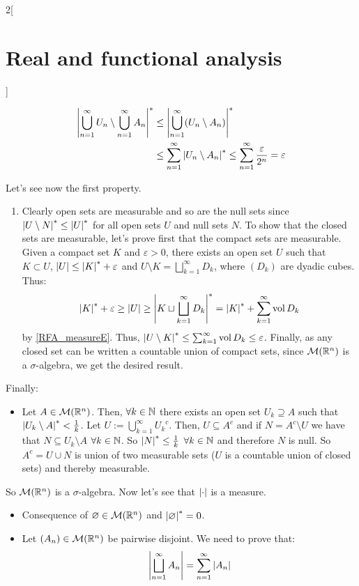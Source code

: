 \documentclass[../../../main_math.tex]{subfiles}
\begin{document}
\begin{multicols}{2}[\section{Real and functional analysis}]
\begin{sproof}
\begin{itemize}
            \begin{align*}
              \om{\bigcup_{n=1}^\infty U_n\setminus\bigcup_{n=1}^\infty A_n} & \leq \om{\bigcup_{n=1}^\infty (U_n\setminus A_n)}                                                      \\
                                                                             & \leq\sum_{n=1}^{\infty}\om{U_n\setminus A_n}\leq\sum_{n=1}^{\infty}\frac{\varepsilon}{2^n}=\varepsilon
            \end{align*}
    \end{itemize}
    Let's see now the first property.
    \begin{enumerate}
      \item Clearly open sets are measurable and so are the null sets since $\om{U\setminus N}\leq\om{U}$ for all open sets $U$ and null sets $N$. To show that the closed sets are measurable, let's prove first that the compact sets are measurable. Given a compact set $K$ and $\varepsilon>0$, there exists an open set $U$ such that $K\subset U$, $\m{U}\leq\om{K}+\varepsilon$ and $U\setminus K=\bigsqcup_{k=1}^\infty D_k$, where $(D_k)$ are dyadic cubes. Thus:
            $$\om{K}+\varepsilon\geq \m{U}\geq\om{K\sqcup\bigsqcup_{k=1}^\infty D_k}=\om{K}+\sum_{k=1}^\infty \vol{D_k}$$
            by \cref{RFA_measureE}. Thus, $\om{U\setminus K}\leq \sum_{k=1}^\infty \vol{D_k}\leq \varepsilon$. Finally, as any closed set can be written a countable union of compact sets, since $\mathcal{M}(\mathbb{R}^n)$ is a $\sigma$-algebra, we get the desired result.
    \end{enumerate}
    Finally:
    \begin{itemize} \item Let $A\in\mathcal{M}(\mathbb{R}^n)$. Then, $\forall k\in\mathbb{N}$ there exists an open set $U_k\supseteq A$ such that $\om{U_k\setminus A}<\frac{1}{k}$. Let $U:=\bigcup_{k=1}^\infty {U_k}^c$. Then, $U\subseteq A^c$ and if $N=A^c\setminus U$ we have that $N\subseteq U_k\setminus A$ $\forall k\in\mathbb{N}$. So $\om{N}\leq\frac{1}{k}$ $\forall k\in\mathbb{N}$ and therefore $N$ is null. So $A^c = U\cup N$ is union of two measurable sets ($U$ is a countable union of closed sets) and thereby measurable.
    \end{itemize}
    So $\mathcal{M}(\mathbb{R}^n)$ is a $\sigma$-algebra. Now let's see that $\m{\cdot}$ is a measure.
    \begin{itemize}
      \item Consequence of $\varnothing\in\mathcal{M}(\mathbb{R}^n)$ and $\om{\varnothing}=0$.
      \item Let $(A_n)\in\mathcal{M}(\mathbb{R}^n)$ be pairwise disjoint. We need to prove that: $$\m{\bigsqcup_{n=1}^\infty A_n}=\sum_{n=1}^\infty \m{A_n}$$

\end{itemize}
\end{sproof}
\end{multicols}
\end{document}
